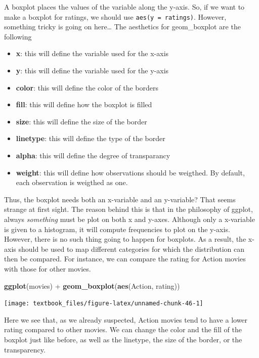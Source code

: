 \documentclass[]{tufte-book}
\newenvironment{Shaded}{}{}
\newcommand{\KeywordTok}[1]{\textcolor[rgb]{0.00,0.44,0.13}{\textbf{#1}}}
\newcommand{\NormalTok}[1]{#1}
\newcommand{\OperatorTok}[1]{\textcolor[rgb]{0.40,0.40,0.40}{#1}}
\newcommand{\StringTok}[1]{\textcolor[rgb]{0.25,0.44,0.63}{#1}}
\providecommand{\tightlist}{%
  \setlength{\itemsep}{0pt}\setlength{\parskip}{0pt}}
\begin{document}
A boxplot places the values of the variable along the y-axis. So, if we want to make a boxplot for ratings, we should use \texttt{aes(y\ =\ ratings)}. However, something tricky is going on here\ldots{} The aesthetics for geom\_boxplot are the following

\begin{itemize}
\tightlist
\item
  \textbf{x}: this will define the variable used for the x-axis
\item
  \textbf{y}: this will define the variable used for the y-axis
\item
  \textbf{color}: this will define the color of the borders
\item
  \textbf{fill}: this will define how the boxplot is filled
\item
  \textbf{size}: this will define the size of the border
\item
  \textbf{linetype}: this will define the type of the border
\item
  \textbf{alpha}: this will define the degree of transparancy
\item
  \textbf{weight}: this will define how observations should be weigthed. By default, each observation is weigthed as one.
\end{itemize}

Thus, the boxplot needs both an x-variable and an y-variable? That seems strange at first sight. The reason behind this is that in the philosophy of ggplot, always \emph{something} must be plot on both x and y-axes. Although only a x-variable is given to a histogram, it will compute frequencies to plot on the y-axis. However, there is no such thing going to happen for boxplots. As a result, the x-axis should be used to map different categories for which the distribution can then be compared. For instance, we can compare the rating for Action movies with those for other movies.

\begin{Shaded}
\begin{Highlighting}[]
\KeywordTok{ggplot}\NormalTok{(movies) }\OperatorTok{+}\StringTok{ }
\StringTok{    }\KeywordTok{geom_boxplot}\NormalTok{(}\KeywordTok{aes}\NormalTok{(Action, rating))}
\end{Highlighting}
\end{Shaded}

\texttt{[image: textbook\_files/figure-latex/unnamed-chunk-46-1]}

Here we see that, as we already suspected, Action movies tend to have a lower rating compared to other movies. We can change the color and the fill of the boxplot just like before, as well as the linetype, the size of the border, or the transparency.
\end{document}
